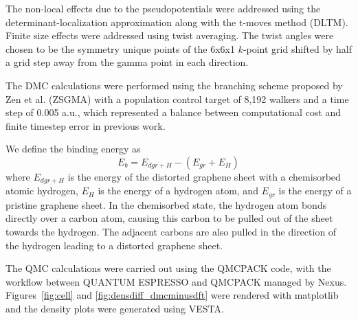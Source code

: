 The non-local effects due to the pseudopotentials were addressed using the determinant-localization approximation along with the t-moves method (DLTM).\cite{zen_new_2019, 10.1063/1.3380831}
Finite size effects were addressed using twist averaging.\cite{PhysRevE.64.016702} The twist angles were chosen to be the symmetry unique points of the 6x6x1 $k$-point grid shifted by half a grid step away from the gamma point in each direction.

The DMC calculations were performed using the branching scheme proposed by Zen
et al. (ZSGMA)\cite{10.1103/PhysRevB.93.241118} with a population control target of 8,192 walkers and a time step of 0.005 a.u., which represented a balance between computational cost and finite timestep error in previous work.\cite{10.1103/PhysRevB.100.075430}



We define the binding energy as
\begin{equation}
E_b=E_{dgr+H}-(E_{gr}+E_{H})
\label{eq:binding}
\end{equation}
where $E_{dgr+H}$ is the energy of the distorted graphene sheet with a chemisorbed atomic hydrogen, $E_H$ is the energy of a hydrogen atom, and $E_{gr}$ is the energy of a pristine graphene sheet.
In the chemisorbed state, the hydrogen atom bonds directly over a carbon atom, causing this carbon to be pulled out of the sheet towards the hydrogen.\cite{10.1063/1.4896611,10.1126/science.aaw6378} 
The adjacent carbons are also pulled in the direction of the hydrogen leading to a distorted graphene sheet.


The QMC calculations were carried out using the QMCPACK code, with the workflow between QUANTUM ESPRESSO and QMCPACK managed by Nexus.\cite{QMCPACK_1,QMCPACK_2,10.1016/j.cpc.2015.08.012}
Figures~\ref{fig:cell} and \ref{fig:densdiff_dmcminusdft} were rendered with matplotlib\cite{matplotlib} and the density plots were generated using VESTA.\cite{10.1107/S0021889811038970}
